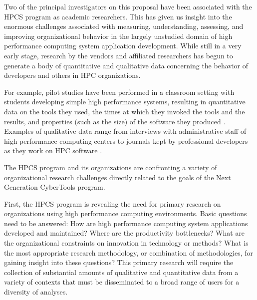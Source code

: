 Two of the principal investigators on this proposal have been associated
with the HPCS program as academic researchers. This has given us insight
into the enormous challenges associated with measuring, understanding,
assessing, and improving organizational behavior in the largely unstudied
domain of high performance computing system application development.  While
still in a very early stage, research by the vendors and affiliated
researchers has begun to generate a body of quantitative and qualitative
data concerning the behavior of developers and others in HPC organizations.

For example, pilot studies have been performed in a classroom setting with
students developing simple high performance systems, resulting in
quantitative data on the tools they used, the times at which they invoked
the tools and the results, and properties (such as the size) of the
software they produced \cite{Funk05}. Examples of qualitative data range
from interviews with administrative staff of high performance computing
centers to journals kept by professional developers as they work on HPC
software \cite{Votta05}.



The HPCS program and its organizations are confronting a variety of
organizational research challenges directly related to the goals of the
Next Generation CyberTools program.

First, the HPCS program is revealing the need for primary research on
organizations using high performance computing environments. Basic
questions need to be answered: How are high performance computing system
applications developed and maintained?  Where are the productivity
bottlenecks? What are the organizational constraints on innovation in
technology or methods? What is the most appropriate research methodology,
or combination of methodologies, for gaining insight into these questions?
This primary research will require the collection of substantial amounts of 
qualitative and quantitative data from a variety of contexts that must be 
disseminated to a broad range of users for a diversity of analyses.


